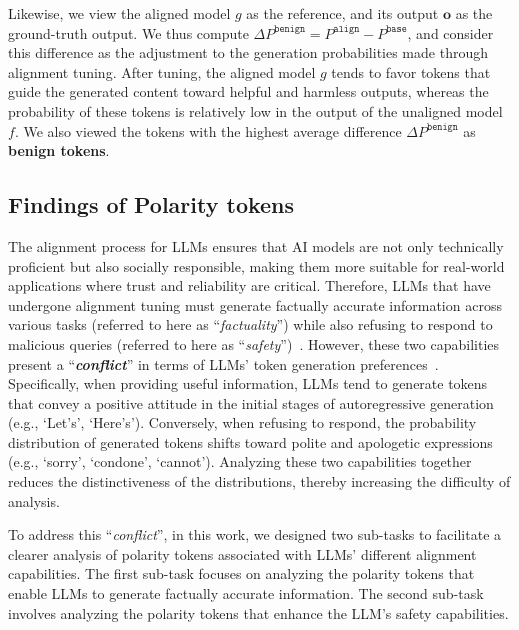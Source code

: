 Likewise, we view  the aligned model $g$ as the reference, and its output $\mathbf{o}$ as the ground-truth output.
We thus compute $\Delta P^{\texttt{benign}} = P^{\texttt{align}} - P^{\texttt{base}}$, and consider this difference as the adjustment to the generation probabilities made through alignment tuning. 
After tuning, the aligned model $g$ tends to favor tokens that guide the generated content toward helpful and harmless outputs, whereas the probability of these tokens is relatively low in the output of the unaligned model $f$.
We also viewed the tokens with the highest average difference $\Delta P^{\texttt{benign}}$ as \textbf{\color{myblue} benign tokens}.

\subsection{Findings of Polarity tokens}
\label{ssec:find}
The alignment process for LLMs ensures that AI models are not only technically proficient but also socially responsible, making them more suitable for real-world applications where trust and reliability are critical.
%
Therefore, LLMs that have undergone alignment tuning must generate factually accurate information across various tasks (referred to here as ``\textit{factuality}'') while also refusing to respond to malicious queries (referred to here as ``\textit{safety}'')~\citep{shen2023large}.
%
However, these two capabilities present a ``\textit{\textbf{conflict}}'' in terms of LLMs’ token generation preferences~\citep{tuan2024towards}. 
Specifically, when providing useful information, LLMs tend to generate tokens that convey a positive attitude in the initial stages of autoregressive generation (e.g., `Let’s', `Here’s'). Conversely, when refusing to respond, the probability distribution of generated tokens shifts toward polite and apologetic expressions (e.g., `sorry', `condone', `cannot'). 
Analyzing these two capabilities together reduces the distinctiveness of the distributions, thereby increasing the difficulty of analysis.

To address this ``\textit{conflict}'', in this work, we designed two sub-tasks to facilitate a clearer analysis of polarity tokens associated with LLMs' different alignment capabilities. 
%
The first sub-task focuses on analyzing the polarity tokens that enable LLMs to generate factually accurate information. The second sub-task involves analyzing the polarity tokens that enhance the LLM’s safety capabilities.



